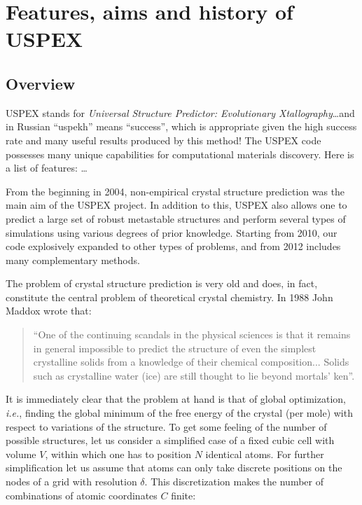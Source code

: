 \documentclass[12pt]{article}
\begin{document}

\newpage
\setcounter{tocdepth}{3}
\tableofcontents

\newpage
\section{Features, aims and history of USPEX}

\subsection{Overview}

USPEX stands for \emph{Universal Structure Predictor: Evolutionary
Xtallography}\ldots and in Russian ``uspekh'' means ``success'', which is
appropriate given the high success rate and many useful results produced by this
method! The USPEX code possesses many unique capabilities for computational
materials discovery. Here is a list of features: \ldots

From the beginning in 2004, non-empirical crystal structure prediction was the
main aim of the USPEX project. In addition to this, USPEX also allows one to
predict a large set of robust metastable structures and perform several types of
simulations using various degrees of prior knowledge. Starting from 2010, our
code explosively expanded to other types of problems, and from 2012 includes
many complementary methods.

The problem of crystal structure prediction is very old and does, in fact,
constitute the central problem of theoretical crystal chemistry. In 1988 John
Maddox \cite{Maddox1988} wrote that:

\begin{quote}
``One of the continuing scandals in the physical sciences is that it remains in
 general impossible to predict the structure of even the simplest crystalline 
 solids from a knowledge of their chemical composition... Solids such as 
 crystalline water (ice) are still thought to lie beyond mortals' ken''. 
\end{quote}

It is immediately clear that the problem at hand is that of global optimization,
\emph{i.e.}, finding the global minimum of the free energy of the crystal (per
mole) with respect to variations of the structure. To get some feeling of the
number of possible structures, let us consider a simplified case of a fixed
cubic cell with volume $V$, within which one has to position $N$ identical
atoms. For further simplification let us assume that atoms can only take
discrete positions on the nodes of a grid with resolution $\delta$. This
discretization makes the number of combinations of atomic coordinates $C$
finite:
\end{document}
